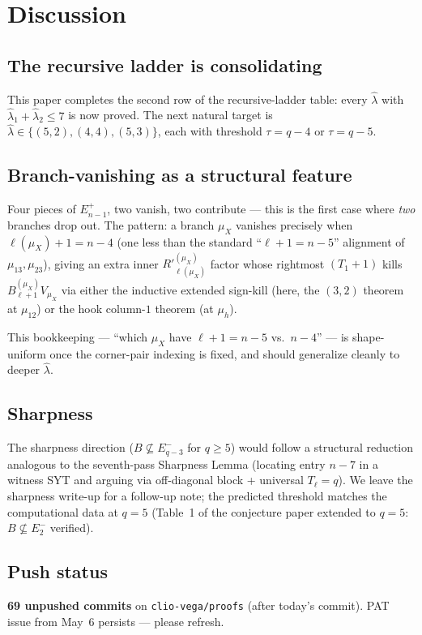 \documentclass[11pt]{article}
\theoremstyle{definition}
\newcommand{\hatl}{\widehat\lambda}
\newcommand{\Rp}{{R'}}
\begin{document}
\section{Discussion}\label{sec:discussion}

\subsection{The recursive ladder is consolidating}

This paper completes the second row of the recursive-ladder table:
every $\hatl$ with $\hatl_1 + \hatl_2 \le 7$ is now proved.  The next
natural target is $\hatl \in \{(5, 2), (4, 4), (5, 3)\}$, each with
threshold $\tau = q - 4$ or $\tau = q - 5$.

\subsection{Branch-vanishing as a structural feature}

Four pieces of $E_{n-1}^+$, two vanish, two contribute --- this is the
first case where \emph{two} branches drop out.  The pattern: a branch
$\mu_X$ vanishes precisely when $\ell(\mu_X) + 1 = n - 4$ (one less
than the standard ``$\ell + 1 = n - 5$'' alignment of $\mu_{13}, \mu_{23}$),
giving an extra inner $\Rp^{(\mu_X)}_{\ell(\mu_X)}$ factor whose
rightmost $(T_1+1)$ kills $B^{(\mu_X)}_{\ell+1} V_{\mu_X}$ via either
the inductive extended sign-kill (here, the $(3, 2)$ theorem at
$\mu_{12}$) or the hook column-$1$ theorem (at $\mu_h$).

This bookkeeping --- ``which $\mu_X$ have $\ell + 1 = n - 5$ vs.\
$n - 4$'' --- is shape-uniform once the corner-pair indexing is
fixed, and should generalize cleanly to deeper $\hatl$.

\subsection{Sharpness}

The sharpness direction ($B \not\subseteq E_{q-3}^-$ for $q \ge 5$)
would follow a structural reduction analogous to the seventh-pass
Sharpness Lemma (locating entry $n - 7$ in a witness SYT and arguing
via off-diagonal block + universal $T_\ell = q$).  We leave the
sharpness write-up for a follow-up note; the predicted threshold
matches the computational data at $q = 5$ (Table~1 of the conjecture
paper extended to $q = 5$: $B \not\subseteq E_2^-$ verified).

\subsection{Push status}

\textbf{69 unpushed commits} on \texttt{clio-vega/proofs} (after
today's commit).  PAT issue from May~6 persists --- please refresh.
\end{document}
